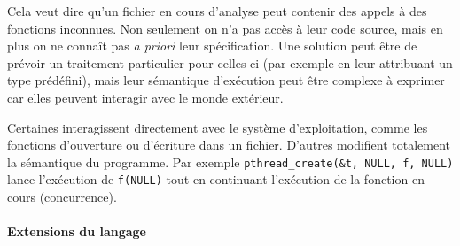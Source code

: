 Cela veut dire qu'un fichier en cours d'analyse peut contenir des appels à des
fonctions inconnues. Non seulement on n'a pas accès à leur code source, mais en
plus on ne connaît pas \emph{a priori} leur spécification. Une solution peut
être de prévoir un traitement particulier pour celles-ci (par exemple en leur
attribuant un type prédéfini), mais leur sémantique d'exécution peut être
complexe à exprimer car elles peuvent interagir avec le monde extérieur.

Certaines interagissent directement avec le système d'exploitation, comme les
fonctions d'ouverture ou d'écriture dans un fichier. D'autres modifient
totalement la sémantique du programme. Par exemple \texttt{pthread\_create(\&t,
NULL, f, NULL)} lance l'exécution de \texttt{f(NULL)} tout en continuant
l'exécution de la fonction en cours (concurrence).

\paragraph{Extensions du langage}

